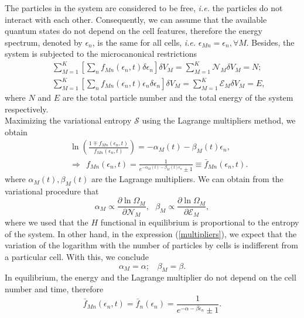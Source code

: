 \documentclass{article}
\newcommand{\de}{\delta}
\newcommand{\Ss}{\mathcal{S}}
\begin{document}
The particles in the system are considered to be free, \textit{i.e.} the particles do not interact with each other.
Consequently, we can assume that the available quantum states do not depend on the cell features,
therefore the energy spectrum, denoted by $\epsilon_n$, is the same for all cells, \textit{i.e.} $\epsilon_{Mn} = \epsilon_n, \forall M$. Besides, the system is subjected to the microcanonical restrictions
\begin{eqnarray}
    &&\sum_{M=1}^{K} \left[ \sum_{n}f_{Mn}(\epsilon_{n} ,t)\de \epsilon_n\right] \de V_M=\sum_{M=1}^{K} {\mathcal{N}}_{M} \de V_M=N; \nonumber \\
    &&\sum_{M=1}^{K}\left[ \sum_{n}f_{Mn}(\epsilon_{n},t)\epsilon_{n}\delta \epsilon_n\right] \de V_M=\sum_{M=1}^{K} {\mathcal{E}}_M \delta V_M=E, \label{restriccions1}
\end{eqnarray}
where $N$ and $E$ are the total particle number and the total energy of the system respectively.\\ 
Maximizing the variational entropy $\Ss$ using the Lagrange multipliers method, we obtain
\begin{eqnarray}
&&\ln \left(\frac{1\mp f_{Mn}(\epsilon_{n},t)}{f_{Mn}(\epsilon_{n},t)} \right)=-\alpha_M(t)-\beta_M(t) \epsilon_{n}, \label{relation}\\ &&\Rightarrow \ \ f_{Mn}(\epsilon_{n},t)=\frac{1}{e^{-\alpha_M(t)-\beta_M(t) \epsilon_{n}}\pm 1} \equiv \bar{f}_{Mn}(\epsilon_{n},t) \label{distributionequilibrium}.
\end{eqnarray}
where $\alpha_M(t), \beta_M(t)$ are the Lagrange multipliers. We can obtain from the variational procedure that 
\begin{equation}
    \alpha_M\propto \frac{\partial \ln \Omega_M}{\partial \mathcal{N}_M}, \ \ \ \beta_M\propto \frac{\partial \ln \Omega_M}{\partial \mathcal{E}_M},\label{multipliers}
\end{equation}
where we used that the $H$ functional in equilibrium is proportional to the entropy of the system.
In other hand, in the expression (\ref{multipliers}), we expect that the variation of the logarithm with the number of particles by cells is indifferent from a particular cell. With this, we conclude  
\begin{equation}
    \alpha_M=\alpha; \ \ \ \ \beta_M=\beta.
\end{equation}
In equilibrium, the energy and the Lagrange multiplier do not depend on the cell number and time, therefore
\begin{equation}
    \bar f_{Mn}(\epsilon_{n},t)=\bar f_n(\epsilon_{n}) =\frac{1}{e^{-\alpha-\beta \epsilon_n}\pm 1}.
\end{equation}{}
\end{document}
